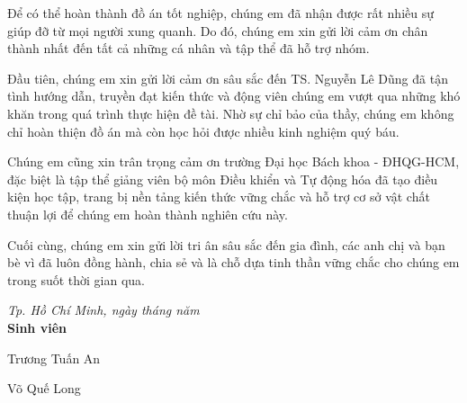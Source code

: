 \documentclass[12pt,a4paper,oneside]{extbook}
\begin{document}
\begin{acknowledgments}

	Để có thể hoàn thành đồ án tốt nghiệp, chúng em đã nhận được rất nhiều sự giúp đỡ từ mọi người xung quanh. Do đó, chúng em xin gửi lời cảm ơn chân thành nhất đến tất cả những cá nhân và tập thể đã hỗ trợ nhóm.

    Đầu tiên, chúng em xin gửi lời cảm ơn sâu sắc đến TS. Nguyễn Lê Dũng đã tận tình hướng dẫn, truyền đạt kiến thức và động viên chúng em vượt qua những khó khăn trong quá trình thực hiện đề tài. Nhờ sự chỉ bảo của thầy, chúng em không chỉ hoàn thiện đồ án mà còn học hỏi được nhiều kinh nghiệm quý báu.

    Chúng em cũng xin trân trọng cảm ơn trường Đại học Bách khoa - ĐHQG-HCM, đặc biệt là tập thể giảng viên bộ môn Điều khiển và Tự động hóa đã tạo điều kiện học tập, trang bị nền tảng kiến thức vững chắc và hỗ trợ cơ sở vật chất thuận lợi để chúng em hoàn thành nghiên cứu này.

    Cuối cùng, chúng em xin gửi lời tri ân sâu sắc đến gia đình, các anh chị và bạn bè vì đã luôn đồng hành, chia sẻ và là chỗ dựa tinh thần vững chắc cho chúng em trong suốt thời gian qua.
    
   \vspace{0.2cm}
    \hfill
    \begin{minipage}{0.65\textwidth}
        \centering
        \textit{Tp. Hồ Chí Minh, ngày \hspace{0.5cm} tháng \hspace{0.5cm} năm \hspace{0.5cm}} \\[0.2cm]
        \textbf{Sinh viên} \\[1.0cm]
        \begin{minipage}[t]{0.48\textwidth}
            \centering
            Trương Tuấn An
        \end{minipage}%
        \hfill
        \begin{minipage}[t]{0.48\textwidth}
            \centering
            Võ Quế Long
        \end{minipage}
    \end{minipage}

\end{acknowledgments}
	
\end{document}

